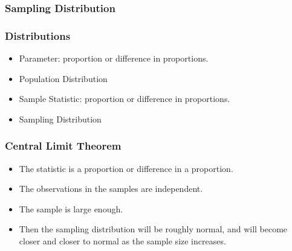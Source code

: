 \documentclass{beamer}
\begin{document}
\begin{frame}
  \frametitle{Sampling Distribution}
  \centering
\end{frame}

\begin{frame}
  \frametitle{Distributions}
  \begin{itemize}
    \item[] 
      Parameter: proportion or difference in proportions.
      \vspace{0.5cm}
    \item[] 
      Population Distribution
      \vspace{0.5cm}
    \item[] 
      Sample Statistic: proportion or difference in proportions.
      \vspace{0.5cm}
    \item[] 
      Sampling Distribution
  \end{itemize}
\end{frame}

\begin{frame}
  \frametitle{Central Limit Theorem}
  \begin{itemize}
    \item[] 
      The statistic is a proportion or difference in a proportion.
      \vspace{0.5cm}
    \item[] 
      The observations in the samples are independent.
      \vspace{0.5cm}
    \item[] 
      The sample is large enough. 
      \vspace{0.5cm}
    \item[] 
      Then the sampling distribution will be roughly normal, and will
      become closer and closer to normal as the sample size increases.
  \end{itemize}
\end{frame}
\end{document}
